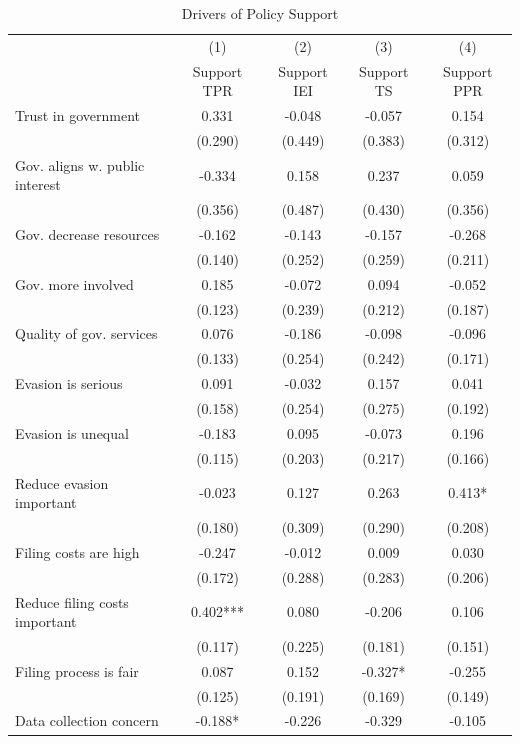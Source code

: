 \documentclass[11pt]{article}
\begin{document}
\FloatBarrier
\begin{table}[!htbp]\centering
\caption{Drivers of Policy Support}
\label{tab:PolicySupportDrivers}
\begin{threeparttable}
\footnotesize
\begin{tabular}{l|cccc}
\toprule
& (1) & (2) & (3) & (4) \\
& Support TPR & Support IEI & Support TS & Support PPR \\
\midrule
Trust in government & 0.331 & -0.048 & -0.057 & 0.154 \\
 & (0.290) & (0.449) & (0.383) & (0.312) \\
Gov. aligns w. public interest & -0.334 & 0.158 & 0.237 & 0.059 \\
 & (0.356) & (0.487) & (0.430) & (0.356) \\
Gov. decrease resources & -0.162 & -0.143 & -0.157 & -0.268 \\
 & (0.140) & (0.252) & (0.259) & (0.211) \\
Gov. more involved & 0.185 & -0.072 & 0.094 & -0.052 \\
 & (0.123) & (0.239) & (0.212) & (0.187) \\
Quality of gov. services & 0.076 & -0.186 & -0.098 & -0.096 \\
 & (0.133) & (0.254) & (0.242) & (0.171) \\
Evasion is serious & 0.091 & -0.032 & 0.157 & 0.041 \\
 & (0.158) & (0.254) & (0.275) & (0.192) \\
Evasion is unequal & -0.183 & 0.095 & -0.073 & 0.196 \\
 & (0.115) & (0.203) & (0.217) & (0.166) \\
Reduce evasion important & -0.023 & 0.127 & 0.263 & 0.413* \\
 & (0.180) & (0.309) & (0.290) & (0.208) \\
Filing costs are high & -0.247 & -0.012 & 0.009 & 0.030 \\
 & (0.172) & (0.288) & (0.283) & (0.206) \\
Reduce filing costs important & 0.402*** & 0.080 & -0.206 & 0.106 \\
 & (0.117) & (0.225) & (0.181) & (0.151) \\
Filing process is fair & 0.087 & 0.152 & -0.327* & -0.255 \\
 & (0.125) & (0.191) & (0.169) & (0.149) \\
Data collection concern & -0.188* & -0.226 & -0.329 & -0.105 \\

\end{tabular}
\end{threeparttable}
\end{table}
\end{document}
